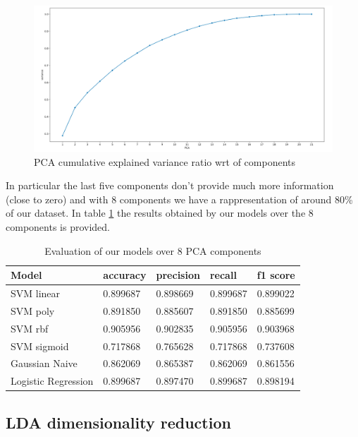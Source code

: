 \documentclass[a4paper,12pt]{article}
\begin{document}
\begin{figure}[H]
  \begin{center}
  \includegraphics[width=1.0\textwidth]{images/pca.png}
  \end{center}
  \caption{PCA cumulative explained variance ratio wrt of components}
  \label{fig:pca}
\end{figure}

\noindent In particular the last five components don't provide much more information (close to zero) and with 8 components we have a rappresentation of around 80\% of our dataset. In table \ref{tab:pca} the results obtained by our models over the 8 components is provided.

\begin{table}[H]
  \begin{tabular}{ |p{4cm}||p{3cm}|p{3cm}|p{3cm}|p{3cm}| }
    \hline
    Model& accuracy & precision  &  recall & f1 score \\
    \hline
SVM linear&           0.899687&   0.898669&  0.899687&  0.899022\\
SVM poly   &          0.891850&   0.885607&  0.891850&  0.885699\\
SVM rbf     &         0.905956&   0.902835&  0.905956&  0.903968\\
SVM sigmoid  &        0.717868&   0.765628&  0.717868&  0.737608\\
Gaussian Naive  &        0.862069&   0.865387&  0.862069&  0.861556\\
Logistic Regression&  0.899687&   0.897470&  0.899687&  0.898194\\
    \hline
  \end{tabular}
  \caption{Evaluation of our models over 8 PCA components}
  \label{tab:pca}
  \end{table}


\subsection{LDA dimensionality reduction}
\end{document}
